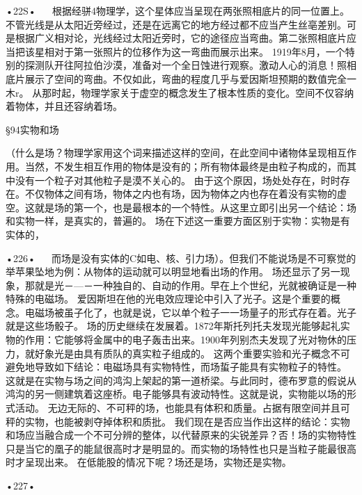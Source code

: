 •22S•
  
根据经骈4物理学，这个星体应当呈现在两张照相底片的同一位置上。不管光线是从太阳近旁经过，还是在远离它的地方经过都不应当产生丝亳差别。可是根据广义相对论，光线经过太阳近旁时，它的途径应当弯曲。第二张照相底片应当把该星相对于第一张照片的位移作为这一弯曲而展示出来。
1919年8月，一个特别的探测队开往阿拉伯沙漠，准备对一个全日蚀进行观察。激动人心的消息！照相底片展示了空间的弯曲。不仅如此，弯曲的程度几乎与爱因斯坦预期的数值完全一木r。
从那时起，物理学家关于虚空的概念发生了根本性质的变化。空间不仅容纳着物体，并且还容纳着场。

§94实物和场

（什么是场？物理学家用这个词来描述这样的空间，在此空间中诸物体呈现相互作用。当然，不发生相互作用的物体是没有的；所有物体最终是由粒子构成的，而其中没有一个粒子对其他粒子是漠不关心的。
由于这个原因，场处处存在，时时存在。不仅物体之间有场，物体之内也有场，因为物体之内也存在着没有实物的虚空。这就是场的第一个，也是最根本的一个特性。从这里立即引出另一个结论：场和实物一样，是真实的，普遍的。
场在下述这一重要方面区别于实物：实物是有实体的，

•226•
  
而场是没有实体的C如电、核、引力场）。但我们不能说场是不可察觉的举苹果坠地为例：从物体的运动就可以明显地看出场的作用。
场还显示了另一现象，那就是光－—－一种独自的、自动的作用。早在上个世纪，光就被确证是一种特殊的电磁场。
爱因斯坦在他的光电效应理论中引入了光子。这是个重要的概念。电磁场被虽子化了，也就是说，它以单个粒子一一场量子的形式存在着。光子就是这些场骰子。
场的历史继续在发展着。1872年斯托列托夫发现光能够起礼实物的作用：它能够将金属中的电子轰击出来。1900年列别杰夫发现了光对物休的压力，就好象光是由具有质队的真实粒子组成的。
这两个重要实验和光子概念不可避免地导致如下结论：电磁场具有实物特性，而场蜇子能具有实物粒子的特性。
这就是在实物与场之间的鸿沟上架起的第一道桥梁。与此同时，德布罗意的假说从鸿沟的另一侧建筑着这座桥。电子能够具有波动特性。这就是说，实物能以场的形式活动。
无边无际的、不可秤的场，也能具有体积和质量。占据有限空间并且可秤的实物，也能被剥夺掉体积和质批。
我们现在是否应当作出这样的结论：实物和场应当融合成一个不可分辨的整体，以代替原来的尖锐差异？否！场的实物特性只是当它的凰子的能鼠很高时才是明显的。而实物的场特性也只是当粒子能最很高时才呈现出来。
在低能股的情况下呢？场还是场，实物还是实物。

•227•

